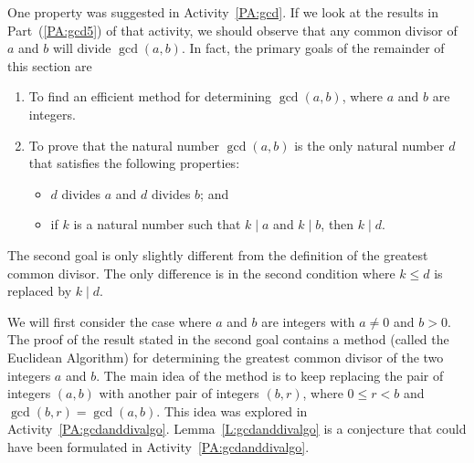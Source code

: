 One property was suggested in \typeu Activity~\ref*{PA:gcd}.  If we look at the results in Part~(\ref{PA:gcd5}) of that \typel activity, we should observe that any common divisor of  $a$  and  $b$  will divide  $\gcd( {a, b} )$.  In fact, the primary goals of the remainder of this section are

\begin{enumerate}
\item To find an efficient method for determining $\gcd( {a, b} )$, where  $a$  and  $b$  are integers.

\item To prove that the natural number  $\gcd( {a, b} )$ is the only natural number  $d$  that satisfies the following properties:

\begin{itemize}
  \item $d$ divides  $a$ and $d$ divides  $b$; and

  \item if  $k$  is a natural number such that  $k \mid a$  and  $k \mid b$, then $k \mid d$\!.
\end{itemize}
\end{enumerate}
%
The second goal is only slightly different from the definition of the greatest common divisor.  The only difference is in the second condition where  $k \leq d$  is replaced by  
$k \mid d$\!.

We will first consider the case where  $a$  and  $b$  are integers with $a \ne 0$ and  $b > 0$.    The proof of the result stated in the second goal contains a method (called the Euclidean Algorithm) for determining the greatest common divisor of the two integers  $a$  and  $b$.  The main idea of the method is to keep replacing the pair of integers  $\left( {a, b} \right)$ with another pair of integers  $\left( {b, r} \right)$, where  $0 \leq r < b$ and  
$\gcd ( {b, r} ) = \gcd ( {a, b} )$.  This idea was explored in \typeu Activity~\ref*{PA:gcdanddivalgo}.  Lemma~\ref{L:gcdanddivalgo} is a conjecture that could have been formulated in \typeu Activity~\ref*{PA:gcdanddivalgo}.

